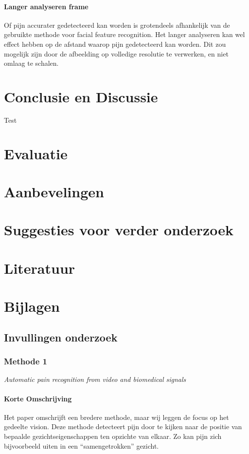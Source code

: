 \documentclass[11pt]{article}
\begin{document}
    \paragraph{Langer analyseren frame}
    Of pijn accurater gedetecteerd kan worden is grotendeels afhankelijk van de gebruikte methode voor facial feature recognition.
    Het langer analyseren kan wel effect hebben op de afstand waarop pijn gedetecteerd kan worden.
    Dit zou mogelijk zijn door de afbeelding op volledige resolutie te verwerken, en niet omlaag te schalen.


    \section{Conclusie en Discussie}
    Test \citet{werner2014automatic}


    \section{Evaluatie}


    \section{Aanbevelingen}


    \section{Suggesties voor verder onderzoek}


    \section{Literatuur}


    \section{Bijlagen}

    \subsection{Invullingen onderzoek}

    \subsubsection{Methode 1}
    \emph{\citet{werner2014automatic} Automatic pain recognition from video and biomedical signals}

    \paragraph{Korte Omschrijving}
    Het paper omschrijft een bredere methode, maar wij leggen de focus op het gedeelte vision.
    Deze methode detecteert pijn door te kijken naar de positie van bepaalde gezichtseigenschappen ten opzichte van elkaar.
    Zo kan pijn zich bijvoorbeeld uiten in een “samengetrokken” gezicht.
\end{document}
